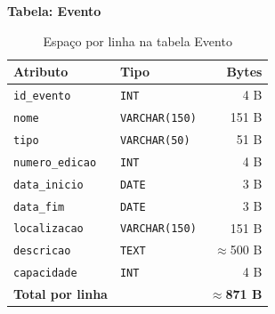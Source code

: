 \documentclass[runningheads]{llncs}
\begin{document}
                \vspace{0.4cm}
                \noindent\begin{minipage}{\textwidth}
                \noindent\textbf{Tabela: Evento}\\[0.2cm]

                \begin{table}[H]
                \centering
                \renewcommand{\arraystretch}{1.3}
                \begin{tabular}{|l|l|r|}
                \hline
                \textbf{Atributo} & \textbf{Tipo} & \textbf{Bytes} \\ \hline
                \texttt{id\_evento}     & \texttt{INT}          & 4 B \\ \hline
                \texttt{nome}           & \texttt{VARCHAR(150)} & 151 B \\ \hline
                \texttt{tipo}           & \texttt{VARCHAR(50)}  & 51 B \\ \hline
                \texttt{numero\_edicao} & \texttt{INT}          & 4 B \\ \hline
                \texttt{data\_inicio}   & \texttt{DATE}         & 3 B \\ \hline
                \texttt{data\_fim}      & \texttt{DATE}         & 3 B \\ \hline
                \texttt{localizacao}    & \texttt{VARCHAR(150)} & 151 B \\ \hline
                \texttt{descricao}      & \texttt{TEXT}         & $\approx$500 B \\ \hline
                \texttt{capacidade}     & \texttt{INT}          & 4 B \\ \hline
                \textbf{Total por linha} & & \textbf{$\approx$871 B} \\ \hline
                \end{tabular}
                \vspace{0.2cm}
                \caption{Espaço por linha na tabela Evento} \label{tab:bytes_evento}
                \end{table}
                \end{minipage}
\end{document}
